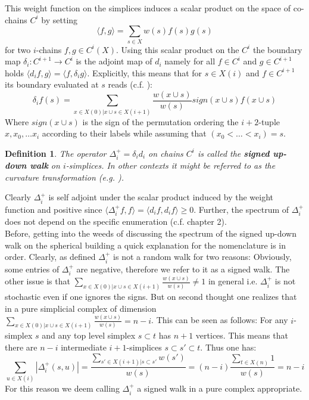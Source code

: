 \documentclass[11pt]{amsart}
\newtheorem{definition}[theorem]{Definition}
\newcommand{\iprod}[1]{\langle#1\rangle}
\begin{document}
    This weight function on the simplices induces a scalar product on the space of co-chains $C^i$ by setting
    \begin{equation}
        \iprod{f,g}=\sum_{s\in X} w(s) f(s)g(s)
    \end{equation}
    for two $i$-chains $f,g\in C^i(X)$. Using this scalar product on the $C^i$ the boundary map $\delta_i:C^{i+1}\rightarrow C^i$ is the adjoint map of $d_i$ namely for all $f\in C^i$ and $g\in C^{i+1}$ holds $\iprod{d_i f,g}=\iprod{f,\delta_i g}$. Explicitly, this means that for $s\in X(i)$ and $f\in C^{i+1}$ its boundary evaluated at $s$ reads (c.f. \cite{Pap16}):
    \begin{equation}
        \delta_i f(s)=\sum_{x\in X(0)|x\cup s\in X(i+1)}\frac{w(x\cup s)}{w(s)} sign(x\cup s)f(x\cup s)
        \label{eq:BoundaryOperator}
    \end{equation}
    Where $sign(x\cup s)$ is the sign of the permutation ordering the $i+2$-tuple $x,x_0,\dots x_i$ according to their labels while assuming that $(x_0<\dots<x_i)=s$.
    \begin{definition}
        The operator $\Delta_i^+=\delta_id_i$ on chains $C^i$ is called the \textbf{signed up-down walk} on $i$-simplices. In other contexts it might be referred to as the curvature transformation (e.g. \cite{Pap16}). 
    \end{definition}
    Clearly $\Delta_i^+$ is self adjoint under the scalar product induced by the weight function and positive since $\iprod{\Delta_i^+f,f}=\iprod{d_if,d_if}\geq 0$. Further, the spectrum of $\Delta_i^+$ does not depend on the specific enumeration (c.f. \cite{Hat02} chapter 2).\\
    Before, getting into the weeds of discussing the spectrum of the signed up-down walk on the spherical building a quick explanation for the nomenclature is in order. Clearly, as defined $\Delta_i^+$ is not a random walk for two reasons: Obviously, some entries of $\Delta_i^+$ are negative, therefore we refer to it as a signed walk. The other issue is that $\sum_{x\in X(0)|x\cup s\in X(i+1)}\frac{w(x\cup s)}{w(s)}\neq 1$ in general i.e. $\Delta_i^+$ is not stochastic even if one ignores the signs. But on second thought one realizes that in a pure simplicial complex of dimension $\sum_{x\in X(0)|x\cup s\in X(i+1)}\frac{w(x\cup s)}{w(s)}=n-i$. This can be seen as follows: For any $i$-simplex $s$ and any top level simplex $s\subset t$ has $n+1$ vertices. This means that there are $n-i$ intermediate $i+1$-simplices $s\subset s'\subset t$. Thus one has:
    \begin{equation}
        \sum_{u\in X(i)}|\Delta_i^+(s,u)|=\frac{\sum_{s'\in X(i+1)|s\subset s'}w(s')}{w(s)}=(n-i)\frac{\sum_{t\in X(n)}1}{w(s)}=n-i
    \end{equation}
    For this reason we deem calling $\Delta_i^+$ a signed walk in a pure complex appropriate.
\end{document}
